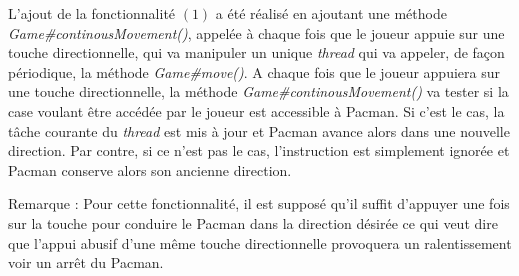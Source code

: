\documentclass[12pt, openany]{report}
\begin{document}
L'ajout de la fonctionnalité $(1)$ a été réalisé en ajoutant une méthode \mbox{\textit{Game\#continousMovement()}}, appelée à chaque fois que le joueur appuie sur une touche directionnelle, qui va manipuler un unique \textit{thread} qui va appeler, de façon périodique, la méthode \mbox{\textit{Game\#move()}}. A chaque fois que le joueur appuiera sur une touche directionnelle, la méthode \mbox{\textit{Game\#continousMovement()}} va tester si la case voulant être accédée par le joueur est accessible à Pacman. Si c'est le cas, la tâche courante du \textit{thread} est mis à jour et Pacman avance alors dans une nouvelle direction. Par contre, si ce n'est pas le cas, l'instruction est simplement ignorée et Pacman conserve alors son ancienne direction. 

Remarque : Pour cette fonctionnalité, il est supposé qu'il suffit d'appuyer une fois sur la touche pour conduire le Pacman dans la direction désirée ce qui veut dire que l'appui abusif d'une même touche directionnelle provoquera un ralentissement voir un arrêt du Pacman.
\end{document}
